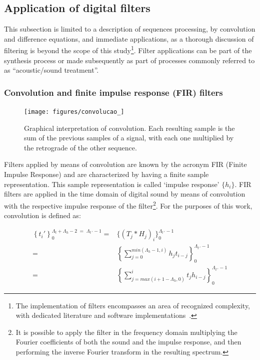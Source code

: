 \subsection{Application of digital filters}\label{subsec:filtros}
This subsection is limited to a description of sequences processing, by convolution and difference equations, and immediate applications, as a thorough discussion of filtering is beyond the scope of this study\footnote{The implementation of filters encompasses an area of recognized complexity, with dedicated literature and software implementations~\cite{Openheim,smith}.}. Filter applications can be part of the synthesis process or made subsequently as part of processes commonly referred to as ``acoustic/sound treatment''.

\subsubsection{Convolution and finite impulse response (FIR) filters}\label{subsec:conv}
\begin{figure}
     \centering
         \texttt{[image: figures/convolucao\_]}
     \caption{Graphical interpretation of convolution. Each resulting sample is the sum of the previous samples of a signal, with each one multiplied by the retrograde of the other sequence.}
         \label{fig:conv}
\end{figure}

Filters applied by means of convolution are known by the acronym FIR (Finite Impulse Response) and are characterized by having a finite sample representation. This sample representation is called `impulse response' $\{h_i\}$. FIR filters are applied in the time domain of digital sound by means of convolution with the respective impulse response of the filter\footnote{It is possible to apply the filter in the frequency domain multiplying the Fourier coefficients of both the sound and the impulse response, and then performing the inverse Fourier transform in the resulting spectrum.\cite{Openheim}}. For the purposes of this work, convolution is defined as:

\begin{equation}\label{eq:conv}
 \begin{split}
 \left\{t_i'\right\}_0^{\Lambda_t+\Lambda_h-2\; = \;\Lambda_{t\, '}-1} = & \{(T_j*H_j)_i\}_0^{\Lambda_{t \, '}-1} \\ = & \left \{ \sum_{j=0}^{min(\Lambda_h-1,i)}h_{j} t_{i-j} \right \}_0^{\Lambda_{t\, '}-1} 
     \\ = & \left \{ \sum_{j=max(i+1-\Lambda_h,0)}^{i}t_j h_{i-j} \right \}_0^{\Lambda_{t\, '}-1}
 \end{split}
\end{equation}

